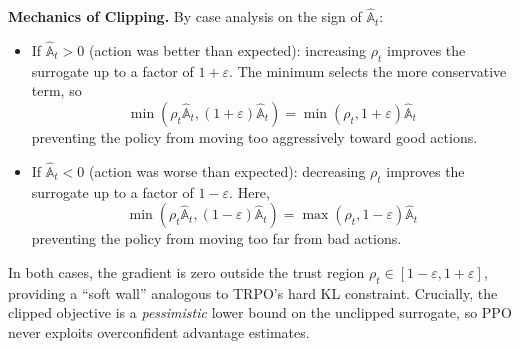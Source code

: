 \documentclass[11pt, letterpaper]{article}
\begin{document}
\begin{remark}
    \textbf{Mechanics of Clipping.} By case analysis on the sign of \(\widehat{\mathbb{A}}_t\): 
    \begin{itemize}
        \item If \(\widehat{\mathbb{A}}_t > 0\) (action was better than expected): increasing \(\rho_t\) improves the surrogate up to a factor of \(1+\varepsilon\). The minimum selects the more conservative term, so 
        \[
            \min(\rho_t \widehat{\mathbb{A}}_t, (1+\varepsilon)\widehat{\mathbb{A}}_t) = \min(\rho_t, 1+\varepsilon) \widehat{\mathbb{A}}_t
        \]
        preventing the policy from moving too aggressively toward good actions. 
        \item If \(\widehat{\mathbb{A}}_t < 0\) (action was worse than expected): decreasing \(\rho_t\) improves the surrogate up to a factor of \(1 - \varepsilon\). Here, 
        \[
            \min(\rho_t \widehat{\mathbb{A}}_t, (1-\varepsilon)\widehat{\mathbb{A}}_t) = \max(\rho_t, 1-\varepsilon) \widehat{\mathbb{A}}_t
        \]
        preventing the policy from moving too far from bad actions. 
    \end{itemize}
    In both cases, the gradient is zero outside the trust region \(\rho_t \in [1-\varepsilon, 1+\varepsilon]\), providing a ``soft wall'' analogous to TRPO's hard KL constraint. Crucially, the clipped objective is a \textit{pessimistic} lower bound on the unclipped surrogate, so PPO never exploits overconfident advantage estimates.


\end{remark}
\end{document}
